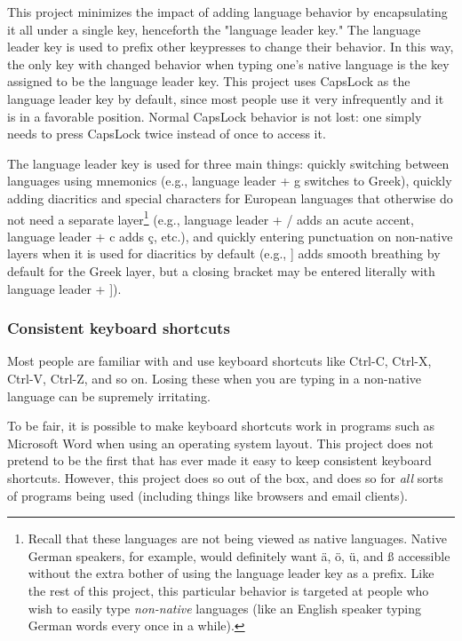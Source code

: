 \documentclass[11pt]{article}
\begin{document}
This project minimizes the impact of adding language behavior by encapsulating it all under a single key, henceforth the "language leader key." The language leader key is used to prefix other keypresses to change their behavior. In this way, the only key with changed behavior when typing one's native language is the key assigned to be the language leader key. This project uses CapsLock as the language leader key by default, since most people use it very infrequently and it is in a favorable position. Normal CapsLock behavior is not lost: one simply needs to press CapsLock twice instead of once to access it.

The language leader key is used for three main things: quickly switching between languages using mnemonics (e.g., language leader + g switches to Greek), quickly adding diacritics and special characters for European languages that otherwise do not need a separate layer\footnote{Recall that these languages are not being viewed as native languages. Native German speakers, for example, would definitely want ä, ö, ü, and ß accessible without the extra bother of using the language leader key as a prefix. Like the rest of this project, this particular behavior is targeted at people who wish to easily type \emph{non-native} languages (like an English speaker typing German words every once in a while).} (e.g., language leader + / adds an acute accent, language leader + c adds ç, etc.), and quickly entering punctuation on non-native layers when it is used for diacritics by default (e.g., ] adds smooth breathing by default for the Greek layer, but a closing bracket may be entered literally with language leader + ]).

\subsubsection{Consistent keyboard shortcuts}
\label{sec:orgabcdaee}

Most people are familiar with and use keyboard shortcuts like Ctrl-C, Ctrl-X, Ctrl-V, Ctrl-Z, and so on. Losing these when you are typing in a non-native language can be supremely irritating.

To be fair, it is possible to make keyboard shortcuts work in programs such as Microsoft Word when using an operating system layout. This project does not pretend to be the first that has ever made it easy to keep consistent keyboard shortcuts. However, this project does so out of the box, and does so for \emph{all} sorts of programs being used (including things like browsers and email clients).
\end{document}
